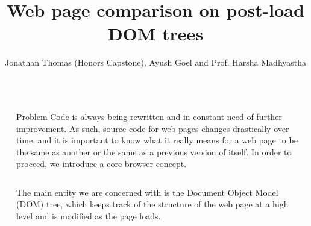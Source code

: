 \documentclass[final]{beamer}
\title{Web page comparison on post-load DOM trees} %
\author{Jonathan Thomas (Honors Capstone), Ayush Goel and Prof. Harsha Madhyastha} %
\institute{University of Michigan} %
\newlength{\sepwid}
\newlength{\halfcolwid}
\newlength{\onecolwid}
\begin{document}

\setlength{\belowcaptionskip}{0.5ex} %
\setlength\belowdisplayshortskip{0.5ex} %

\begin{frame}[t] %

\begin{columns}[t] %

\begin{column}{\sepwid}\end{column} %

\begin{column}{\onecolwid} %


\begin{alertblock}{Problem}
Code is always being rewritten and in constant need of further improvement. As such, source code for web pages changes drastically over time, and it is important to know what it really means for a web page to be the same as another or the same as a previous version of itself. In order to proceed, we introduce a core browser concept.

\begin{columns}
\begin{column}{\halfcolwid}
The main entity we are concerned with is the Document Object Model (DOM) tree, which keeps track of the structure of the web page at a high level and is modified as the page loads. 
\end{column}


\end{columns}
\end{alertblock}
\end{column}
\end{columns}
\end{frame}
\end{document}

